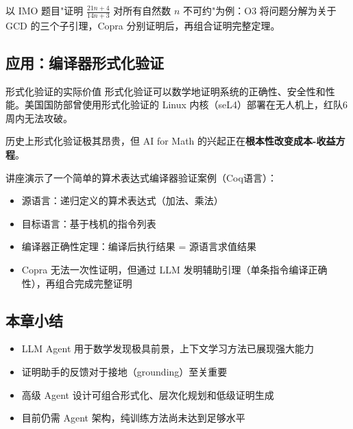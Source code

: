 以 IMO 题目"证明 $\frac{21n+4}{14n+3}$ 对所有自然数 $n$ 不可约"为例：O3 将问题分解为关于 GCD 的三个子引理，Copra 分别证明后，再组合证明完整定理。

\subsection{应用：编译器形式化验证}

\begin{knowledgebox}{形式化验证的实际价值}
形式化验证可以数学地证明系统的正确性、安全性和性能。美国国防部曾使用形式化验证的 Linux 内核（seL4）部署在无人机上，红队6周内无法攻破。

历史上形式化验证极其昂贵，但 AI for Math 的兴起正在\textbf{根本性改变成本-收益方程}。
\end{knowledgebox}

讲座演示了一个简单的算术表达式编译器验证案例（Coq语言）：
\begin{itemize}
    \item 源语言：递归定义的算术表达式（加法、乘法）
    \item 目标语言：基于栈机的指令列表
    \item 编译器正确性定理：编译后执行结果 = 源语言求值结果
    \item Copra 无法一次性证明，但通过 LLM 发明辅助引理（单条指令编译正确性），再组合完成完整证明
\end{itemize}

\subsection{本章小结}

\begin{itemize}
    \item LLM Agent 用于数学发现极具前景，上下文学习方法已展现强大能力
    \item 证明助手的反馈对于接地（grounding）至关重要
    \item 高级 Agent 设计可组合形式化、层次化规划和低级证明生成
    \item 目前仍需 Agent 架构，纯训练方法尚未达到足够水平
\end{itemize}

